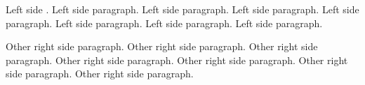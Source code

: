 \documentclass{article}
\begin{document}
        \beginnumbering
            \pstart
                Left side . Left side paragraph. Left side paragraph. Left side paragraph. Left side paragraph. Left side paragraph. Left side paragraph. Left side paragraph.
            \pend



            \pstart
                Other right side paragraph. Other right side paragraph. Other right side paragraph. Other right side paragraph. Other right side paragraph. Other right side paragraph. Other right side paragraph.
            \pend
        \endnumbering
\end{document}

